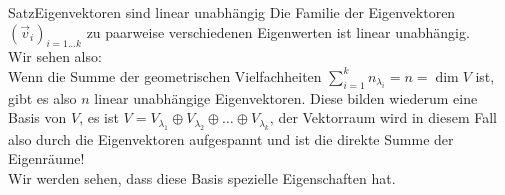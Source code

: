 \begin{Satz}{Satz}{Eigenvektoren sind linear unabhängig}
Die Familie der Eigenvektoren $(\Vec{v}_i)_{i=1...k}$ zu paarweise verschiedenen Eigenwerten ist linear unabhängig.\\
Wir sehen also:\\
Wenn die Summe der geometrischen Vielfachheiten $\sum_{i=1}^k n_{\lambda_i}=n=\dim V$ ist, gibt es also $n$ linear unabhängige Eigenvektoren. Diese bilden wiederum eine Basis von $V$, es ist $V=V_{\lambda_1}\oplus V_{\lambda_2}\oplus\ldots\oplus V_{\lambda_k}$, der Vektorraum wird in diesem Fall also durch die Eigenvektoren aufgespannt und ist die direkte Summe der Eigenräume!\\
Wir werden sehen, dass diese Basis spezielle Eigenschaften hat.
\end{Satz}


